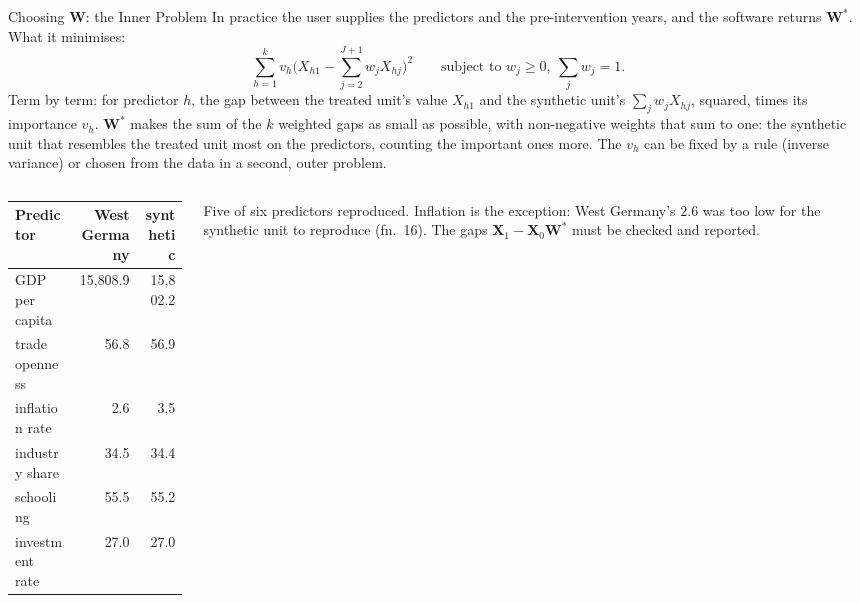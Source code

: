 \documentclass[main.tex]{subfiles}
\begin{document}
\begin{frame}{Choosing $\mathbf{W}$: the Inner Problem}
  \small
  In practice the user supplies the predictors and the pre-intervention years,
  and the software returns $\mathbf{W}^{*}$. What it minimises:
  \[
    \sum_{h=1}^{k} v_h \Big( X_{h1} - \sum_{j=2}^{J+1} w_j X_{hj} \Big)^2
    \qquad \text{subject to } w_j \ge 0,\ \sum_j w_j = 1 .
  \]
  Term by term: for predictor $h$, the gap between the treated unit's value
  $X_{h1}$ and the synthetic unit's $\sum_j w_j X_{hj}$, squared, times its
  importance $v_h$. $\mathbf{W}^{*}$ makes the sum of the $k$ weighted gaps as
  small as possible, with non-negative weights that sum to one: the synthetic
  unit that resembles the treated unit most on the predictors, counting the
  important ones more. The $v_h$ can be fixed by a rule (inverse variance) or
  chosen from the data in a second, outer problem.
  \smallskip
  \begin{columns}[T]
    \begin{column}{0.50\textwidth}
      \footnotesize
      \begin{tabular}{@{}lrr@{}}
        \toprule
        Predictor & West Germany & synthetic \\
        \midrule
        GDP per capita & 15{,}808.9 & 15{,}802.2 \\
        trade openness & 56.8 & 56.9 \\
        inflation rate & 2.6 & \alert{3.5} \\
        industry share & 34.5 & 34.4 \\
        schooling & 55.5 & 55.2 \\
        investment rate & 27.0 & 27.0 \\
        \bottomrule
      \end{tabular}
    \end{column}
    \begin{column}{0.46\textwidth}
      \footnotesize
      Five of six predictors reproduced. Inflation is the exception: West
      Germany's $2.6$ was too low for the synthetic unit to reproduce
      (fn.~16). The gaps $\mathbf{X}_1 - \mathbf{X}_0 \mathbf{W}^{*}$ must be
      checked and reported.
    \end{column}
  \end{columns}
\end{frame}
\end{document}
